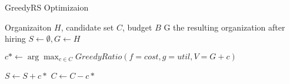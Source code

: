
\begin{algorithm}
	\caption{ GreedyRS Optimizaion }
	\label{alg:greed-RS}
	\begin{algorithmic}[1]
		\renewcommand{\algorithmicrequire}{\textbf{Input:}}
		\renewcommand{\algorithmicensure}{\textbf{Output:}}
		\Require Organizaiton $ H $, candidate set $ C $, budget $ B $
		\Ensure G the resulting organization after hiring
		\State $S \leftarrow \emptyset, G \leftarrow H$
		
			\State $c* \leftarrow \arg \max_{c \in C} GreedyRatio(f=cost,g=util,V=G+c)$
			
				\State $S \leftarrow S + c* $
			\EndIf
			\State $C \leftarrow C - c*$
		\EndWhile
	\end{algorithmic}
\end{algorithm}